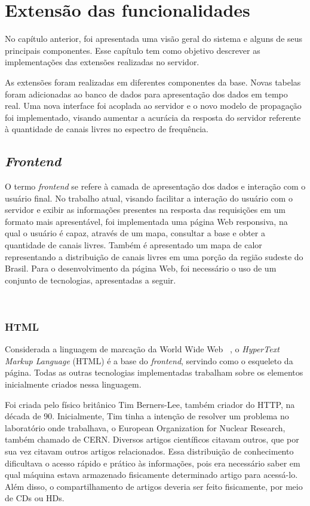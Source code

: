 \chapter{Extensão das funcionalidades}

No capítulo anterior, foi apresentada uma visão geral do sistema e alguns de seus principais componentes. Esse capítulo tem como objetivo descrever as implementações das extensões realizadas no servidor.

As extensões foram realizadas em diferentes componentes da base. Novas tabelas foram adicionadas ao banco de dados para apresentação dos dados em tempo real. Uma nova interface foi acoplada ao servidor e o novo modelo de propagação foi implementado, visando aumentar a acurácia da resposta do servidor referente à quantidade de canais livres no espectro de frequência.

\section{\textit{Frontend} }

O termo \textit{frontend} se refere à camada de apresentação dos dados e interação com o usuário final. No trabalho atual, visando facilitar a interação do usuário com o servidor e exibir as informações presentes na resposta das requisições em um formato mais apresentável, foi implementada uma página Web responsiva, na qual o usuário é capaz, através de um mapa, consultar a base e obter a quantidade de canais livres. Também é apresentado um mapa de calor representando a distribuição de canais livres em uma porção da região sudeste do Brasil.
Para o desenvolvimento da página Web, foi necessário o uso de um conjunto de tecnologias, apresentadas a seguir.

\
\subsection{HTML}

Considerada a linguagem de marcação da World Wide Web ~\cite{htmlw3cs}, o \textit{HyperText Markup Language} (HTML) é a base do \textit{frontend}, servindo como o esqueleto da página. Todas as outras tecnologias implementadas trabalham sobre os elementos inicialmente criados nessa linguagem.

Foi criada pelo físico britânico Tim Berners-Lee, também criador do HTTP,
na década de 90. Inicialmente, Tim tinha a intenção de resolver um problema no laboratório onde trabalhava, o European Organization for Nuclear Research, também chamado de CERN. Diversos artigos científicos citavam outros, que por sua vez citavam outros artigos relacionados. Essa distribuição de conhecimento dificultava o acesso rápido e prático às informações, pois era necessário saber em qual máquina estava armazenado fisicamente determinado artigo para acessá-lo. Além disso, o compartilhamento de artigos deveria ser feito fisicamente, por meio de CDs ou HDs.

